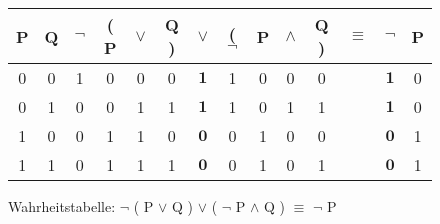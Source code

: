 \begin{landscape}
    \begin{figure}[H]
        \begin{center}
            \begin{tabular}{|c|c||c|c|c|c|c|c|c|c|c||c||c|c|}
                \hline
                P & Q & $\neg$ & ( P & $\vee$ & Q ) & $\vee$       & ( $\neg$ & P & $\wedge$ & Q ) & $\equiv$ & $\neg$       & P \\ \hline \hline
                0 & 0 & 1      & 0   & 0      & 0   & $\mathbf{1}$ & 1        & 0 & 0        & 0   &          & $\mathbf{1}$ & 0 \\ \hline
                0 & 1 & 0      & 0   & 1      & 1   & $\mathbf{1}$ & 1        & 0 & 1        & 1   &          & $\mathbf{1}$ & 0 \\ \hline
                1 & 0 & 0      & 1   & 1      & 0   & $\mathbf{0}$ & 0        & 1 & 0        & 0   &          & $\mathbf{0}$ & 1 \\ \hline
                1 & 1 & 0      & 1   & 1      & 1   & $\mathbf{0}$ & 0        & 1 & 0        & 1   &          & $\mathbf{0}$ & 1 \\ \hline
            \end{tabular}
            \caption{Wahrheitstabelle: $\neg$ ( P $\vee$ Q ) $\vee$ ( $\neg$ P $\wedge$ Q ) $\equiv$ $\neg$ P}\label{fig:figureFormulaTable0}
        \end{center}
    \end{figure}
\end{landscape}